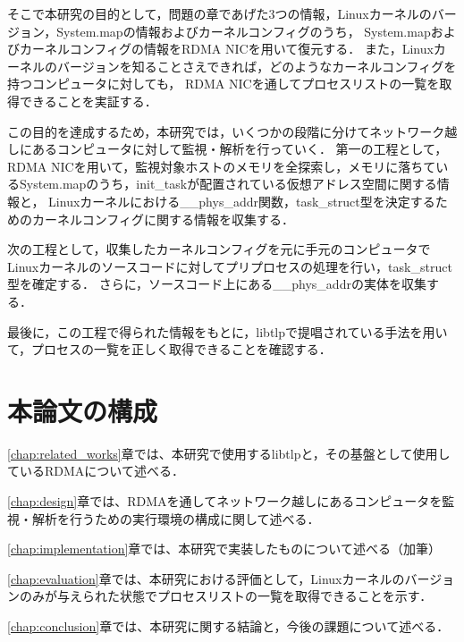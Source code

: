 そこで本研究の目的として，問題の章であげた3つの情報，Linuxカーネルのバージョン，System.mapの情報およびカーネルコンフィグのうち，
System.mapおよびカーネルコンフィグの情報をRDMA NICを用いて復元する．
また，Linuxカーネルのバージョンを知ることさえできれば，どのようなカーネルコンフィグを持つコンピュータに対しても，
RDMA NICを通してプロセスリストの一覧を取得できることを実証する．

この目的を達成するため，本研究では，いくつかの段階に分けてネットワーク越しにあるコンピュータに対して監視・解析を行っていく．
第一の工程として，RDMA NICを用いて，監視対象ホストのメモリを全探索し，メモリに落ちているSystem.mapのうち，init_taskが配置されている仮想アドレス空間に関する情報と，
Linuxカーネルにおける__phys_addr関数，task_struct型を決定するためのカーネルコンフィグに関する情報を収集する．

次の工程として，収集したカーネルコンフィグを元に手元のコンピュータでLinuxカーネルのソースコードに対してプリプロセスの処理を行い，task_struct型を確定する．
さらに，ソースコード上にある__phys_addrの実体を収集する．

最後に，この工程で得られた情報をもとに，libtlpで提唱されている手法を用いて，プロセスの一覧を正しく取得できることを確認する．

\section{本論文の構成}

\ref{chap:related_works}章では、本研究で使用するlibtlpと，その基盤として使用しているRDMAについて述べる．

\ref{chap:design}章では、RDMAを通してネットワーク越しにあるコンピュータを監視・解析を行うための実行環境の構成に関して述べる．

\ref{chap:implementation}章では、本研究で実装したものについて述べる（加筆）

\ref{chap:evaluation}章では、本研究における評価として，Linuxカーネルのバージョンのみが与えられた状態でプロセスリストの一覧を取得できることを示す．

\ref{chap:conclusion}章では、本研究に関する結論と，今後の課題について述べる．
